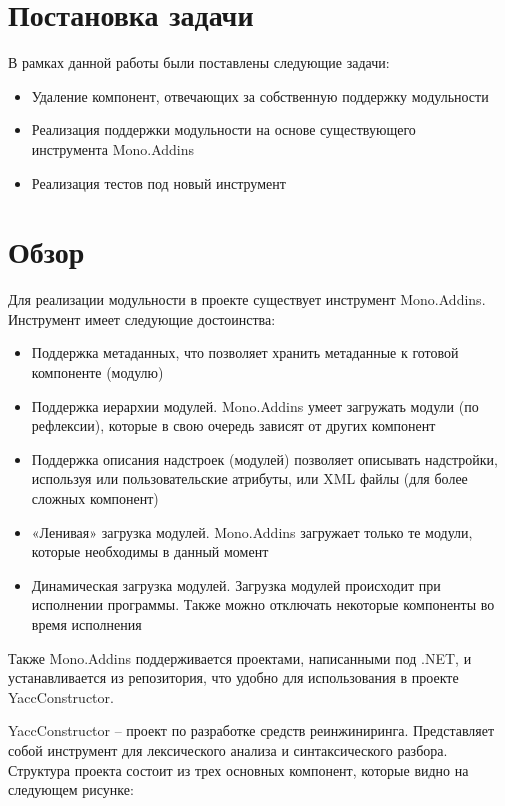 \documentclass{matmex-diploma}
\begin{document}
\section{Постановка задачи}
В рамках данной работы были поставлены следующие задачи:
\begin{itemize}
\item Удаление компонент, отвечающих за собственную поддержку модульности
\item Реализация поддержки модульности на основе существующего \\инструмента Mono.Addins
\item Реализация тестов под новый инструмент
\end{itemize}

\section{Обзор}
Для реализации модульности в проекте существует инструмент Mono.Addins.\cite{Mono.Addins}
Инструмент имеет следующие достоинства\cite{Mono.AddinsDoc}:
\begin{itemize}
\item Поддержка метаданных, что позволяет хранить метаданные к готовой компоненте (модулю)
\item Поддержка иерархии модулей. Mono.Addins умеет загружать модули (по рефлексии), которые в свою очередь зависят от других компонент
\item Поддержка описания надстроек (модулей) позволяет описывать надстройки, используя или пользовательские атрибуты, или XML файлы (для более сложных компонент)
\item «Ленивая» загрузка модулей. Mono.Addins загружает только те модули, которые необходимы в данный момент
\item Динамическая загрузка модулей. Загрузка модулей происходит при исполнении программы. Также можно отключать некоторые компоненты во время исполнения
\end{itemize}

Также Mono.Addins поддерживается проектами, написанными под .NET, и устанавливается из репозитория, что удобно для использования в проекте YaccConstructor.

YaccConstructor – проект по разработке средств реинжиниринга\cite{YC}. Представляет собой инструмент для лексического анализа и синтаксического разбора\cite{YC_base}.  Структура проекта состоит из трех основных компонент, которые видно на следующем рисунке:
\end{document}
